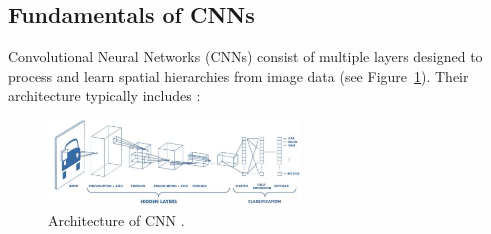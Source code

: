 \subsection{Fundamentals of CNNs}
Convolutional Neural Networks (CNNs) consist of multiple layers designed to process and learn spatial hierarchies from image data (see Figure~\ref{fig:figure04}). Their architecture typically includes \parencite{alzubaidi2021review}:


     \begin{figure}[H] %
        \centering
        \includegraphics[width=0.6\textwidth]{chapters/chapter1/images/Figure04.png}
        \caption{Architecture of CNN \cite{purwono2022understanding}.}
        \label{fig:figure04}
    \end{figure}

